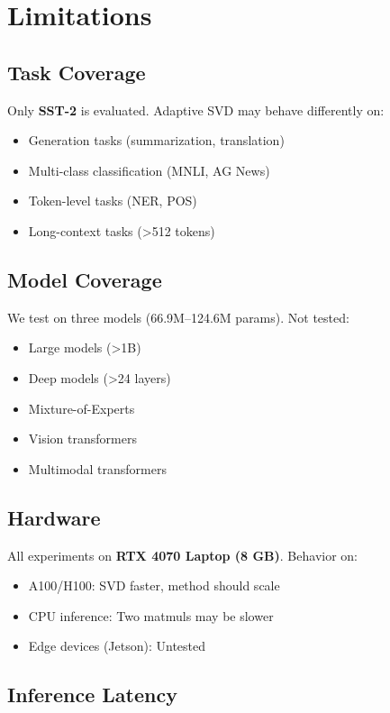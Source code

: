 
\section{Limitations}

\subsection{Task Coverage}

Only \textbf{SST-2} is evaluated. Adaptive SVD may behave differently on:
\begin{itemize}
\item Generation tasks (summarization, translation)
\item Multi-class classification (MNLI, AG News)
\item Token-level tasks (NER, POS)
\item Long-context tasks (\textgreater{}512 tokens)

\end{itemize}
\subsection{Model Coverage}

We test on three models (66.9M--124.6M params). Not tested:
\begin{itemize}
\item Large models (\textgreater{}1B)
\item Deep models (\textgreater{}24 layers)
\item Mixture-of-Experts
\item Vision transformers
\item Multimodal transformers

\end{itemize}
\subsection{Hardware}

All experiments on \textbf{RTX 4070 Laptop (8 GB)}. Behavior on:
\begin{itemize}
\item A100/H100: SVD faster, method should scale
\item CPU inference: Two matmuls may be slower
\item Edge devices (Jetson): Untested

\end{itemize}
\subsection{Inference Latency}

